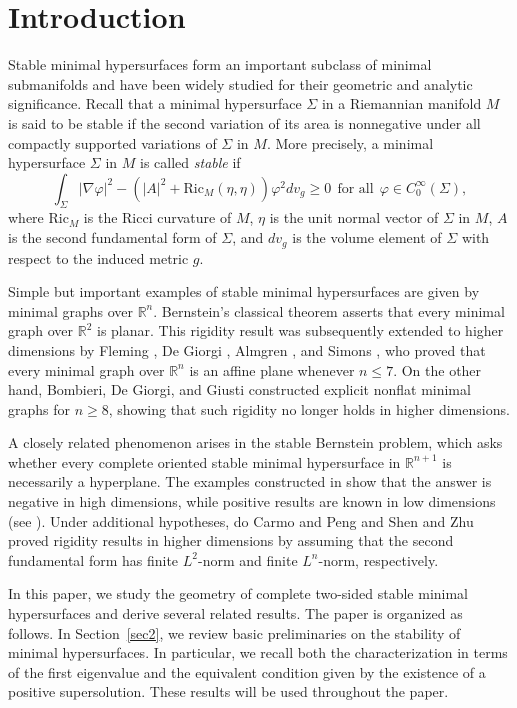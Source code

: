 \documentclass[amssymb,amstex,amsmath,11pt]{article}
\numberwithin{equation}{section}
\theoremstyle{plain}
\theoremstyle{definition}
\theoremstyle{remark}
\newcommand{\is}{\int_{\Sigma}}
\def\Ricm{\textrm{Ric}_M}
\begin{document}
\section{Introduction}

Stable minimal hypersurfaces form an important subclass of minimal submanifolds and have been widely studied for their geometric and analytic significance.
Recall that a minimal hypersurface $\Sigma$ in a Riemannian manifold $M$ is said to be stable if the second variation of its area is nonnegative under all compactly supported variations of $\Sigma$ in $M$.
More precisely, a minimal hypersurface $\Sigma$ in $M$ is called \textit{stable} if
$$\is |\nabla \varphi|^2 - ( |A|^2 + \Ricm(\eta,\eta) )\varphi^2 dv_g \geq 0 ~~ \text{for all} ~~ \varphi\in C^{\infty}_0(\Sigma),$$
where $\Ricm$ is the Ricci curvature of $M$, $\eta$ is the unit normal vector of $\Sigma$ in $M$, $A$ is the second fundamental form of $\Sigma$, and $dv_g$ is the volume element of $\Sigma$ with respect to the induced metric $g$.

Simple but important examples of stable minimal hypersurfaces are given by minimal graphs over $\mathbb{R}^n$. Bernstein's classical theorem \cite{B27} asserts that every minimal graph over $\mathbb{R}^2$ is planar. This rigidity result was subsequently extended to higher dimensions by Fleming \cite{F62}, De Giorgi \cite{G65}, Almgren \cite{A66}, and Simons \cite{S68}, who proved that every minimal graph over $\mathbb{R}^n$ is an affine plane whenever $n \leq 7$. On the other hand, Bombieri, De Giorgi, and Giusti \cite{BGG69} constructed explicit nonflat minimal graphs for $n \geq 8$, showing that such rigidity no longer holds in higher dimensions.


A closely related phenomenon arises in the stable Bernstein problem, which asks whether every complete oriented stable minimal hypersurface in $\mathbb{R}^{n+1}$ is necessarily a hyperplane. The examples constructed in \cite{BGG69} show that the answer is negative in high dimensions, while positive results are known in low dimensions (see \cite{CMR24, CL24, CLMS, CP79, FC&S80, M}). Under additional hypotheses, do Carmo and Peng \cite{CP80} and Shen and Zhu \cite{SZ98} proved rigidity results in higher dimensions by assuming that the second fundamental form has finite $L^2$-norm and finite $L^n$-norm, respectively.

In this paper, we study the geometry of complete two-sided stable minimal hypersurfaces and derive several related results. The paper is organized as follows. In Section~\ref{sec2}, we review basic preliminaries on the stability of minimal hypersurfaces. In particular, we recall both the characterization in terms of the first eigenvalue and the equivalent condition given by the existence of a positive supersolution. These results will be used throughout the paper.
\end{document}
